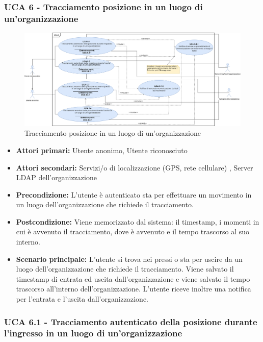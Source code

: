 \subsubsection{UCA 6 - Tracciamento posizione in un luogo di un'organizzazione}%

\begin{figure}[h]
	\centering
	\includegraphics[scale=0.3, center]{Sezioni/UseCase/Immagini/UCA6.png}
	\caption{Tracciamento posizione in un luogo di un'organizzazione}
\end{figure}

\begin{itemize}
	\item \textbf{Attori primari:} Utente anonimo, Utente riconosciuto
	\item \textbf{Attori secondari:} Servizi/o di localizzazione (GPS, rete cellulare) , Server LDAP dell'organizzazione
	\item \textbf{Precondizione:} L'utente è autenticato sta per effettuare un movimento in un luogo dell'organizzazione che richiede il tracciamento.
	\item \textbf{Postcondizione:} Viene memorizzato dal sistema: il timestamp, i momenti in cui è avvenuto il tracciamento, dove è avvenuto e il tempo trascorso al suo interno.
	\item \textbf{Scenario principale:} L'utente si trova nei pressi o sta per uscire da un luogo dell'organizzazione che richiede il tracciamento. Viene salvato il timestamp di entrata ed uscita dall'organizzazione e viene salvato il tempo trascorso all'interno dell'organizzazione. L'utente riceve inoltre una notifica per l'entrata e l'uscita dall'organizzazione.
\end{itemize}

\subsubsection{UCA 6.1 - Tracciamento autenticato della posizione durante l'ingresso in un luogo di un'organizzazione}


